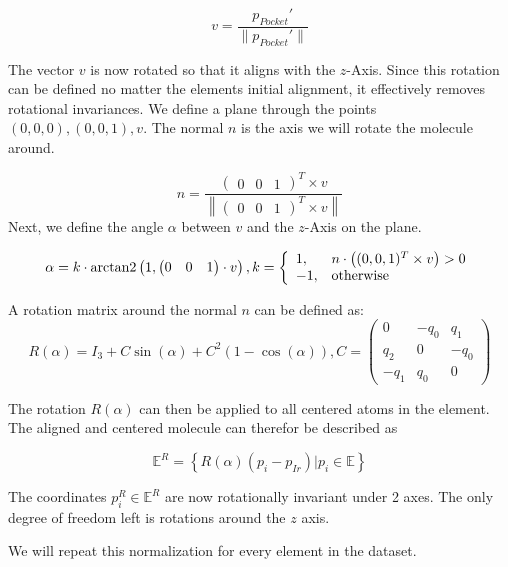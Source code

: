 $$ v = \frac{p_{Pocket}'}{\| p_{Pocket}'\| } $$

The vector $v$ is now rotated so that it aligns with the $z$-Axis.
Since this rotation can be defined no matter the elements initial alignment, it effectively removes rotational invariances.
We define a plane through the points $(0,0,0), (0,0,1), v$.
The normal $n$ is the axis we will rotate the molecule around.

$$
n =\frac{\begin{pmatrix}
  0 &
  0 &
  1
\end{pmatrix}^T \times v}{ \left\| \begin{pmatrix}
  0 &
  0 &
  1
\end{pmatrix}^T \times v \right\| }
$$
Next, we define the angle $\alpha$ between $v$ and the $z$-Axis on the plane.

$$ 
\alpha = k \cdot \operatorname{arctan2} \left( 1,  
\begin{pmatrix} 0 &  0 & 1 \end{pmatrix} \cdot v \right),\space k = \left\{\begin{array}{ll} 1, & n \cdot \left( (0,0,1)^T \times v \right) > 0 \\
  -1, & \text{otherwise}\end{array}\right.
$$

A rotation matrix around the normal $n$ can be defined as:
$$
R(\alpha) = I_3 + C \sin(\alpha) + C^2(1 - \cos(\alpha)), C =
\begin{pmatrix}
  0 & -q_0 & q_1 \\
  q_2 & 0 & -q_0\\
  -q_1 & q_0 & 0
\end{pmatrix}
$$


The rotation $R(\alpha)$ can then be applied to all centered atoms in the element.
The aligned and centered molecule can therefor be described as

$$ 
\mathbb{E}^R = \left\{ R(\alpha) (p_i - p_{Ir}) |  p_i \in \mathbb{E} \right\}
$$

The coordinates $p^R_i \in \mathbb{E}^R$ are now rotationally invariant under 2 axes. 
The only degree of freedom left is rotations around the $z$ axis. 

We will repeat this normalization for every element in the dataset.






